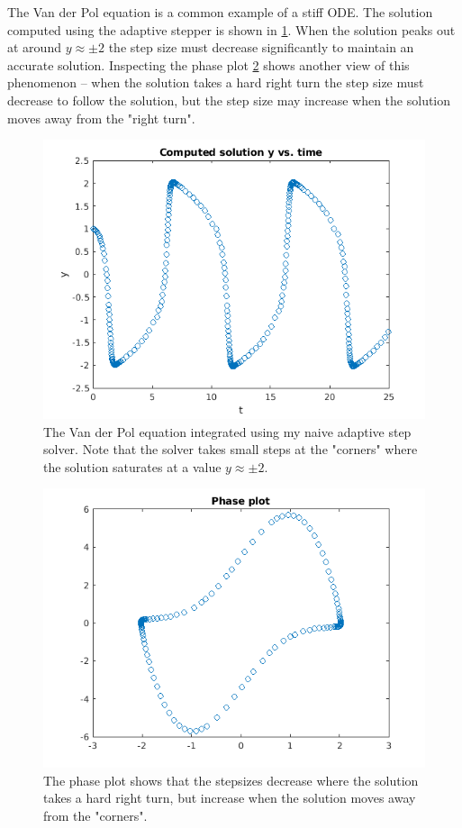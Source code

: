 \documentclass[hidelinks,notitlepage]{book}
\begin{document}
The Van der Pol equation is a common example of a stiff ODE.  The solution computed using the adaptive stepper is shown in \cref{fig:AdaptiveEHVanDerPol}.  When the solution peaks out at around $y \approx \pm 2$ the step size must decrease significantly to maintain an accurate solution.  Inspecting the phase plot \cref{fig:AdaptiveEHVanDerPolPhase} shows another view of this phenomenon -- when the solution takes a hard right turn the step size must decrease to follow the solution, but the step size may increase when the solution moves away from the "right turn".
\begin{figure}[h]
	\centering
	\includegraphics[width=0.7\columnwidth]{AdaptiveEHVanDerPol.png}
	\caption{The Van der Pol equation integrated using my naive adaptive step solver.  Note that the solver takes small steps at the "corners" where the solution saturates at a value $y \approx \pm 2$.}
	\label{fig:AdaptiveEHVanDerPol}
\end{figure}
\begin{figure}[h]
	\centering
	\includegraphics[width=0.7\columnwidth]{AdaptiveEHVanDerPolPhase.png}
	\caption{The phase plot shows that the stepsizes decrease where the solution takes a hard right turn, but increase when the solution moves away from the "corners".}
	\label{fig:AdaptiveEHVanDerPolPhase}
\end{figure}
\end{document}
